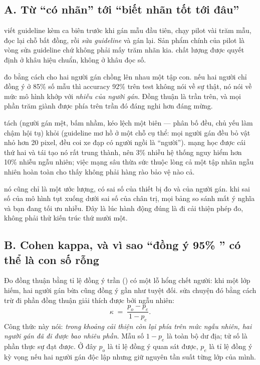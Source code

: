 \documentclass[../../deep_learning.tex]{subfiles}
\begin{document}
\subsection{A. Từ ``có nhãn'' tới ``biết nhãn tốt tới đâu''}
\begin{mach}
\item {} \gp viết guideline kèm ca biên trước khi gán mẫu đầu tiên, chạy pilot vài trăm mẫu, đọc lại chỗ bất đồng, rồi \emph{sửa guideline} và gán lại. Sản phẩm chính của pilot là vòng sửa guideline chứ không phải mấy trăm nhãn kia. \hq chất lượng được quyết định ở khâu hiệu chuẩn, không ở khâu đọc số.
\item {} \gp đo  bằng cách cho hai người gán chồng lên nhau một tập con. \hq nếu hai người chỉ đồng ý ở 85\%
 số mẫu thì accuracy 92\%
trên test không nói về sự thật, nó nói về mức mô hình khớp với \emph{nhiễu của người gán}. Đồng thuận là trần trên, và mọi phần trăm giành được phía trên trần đó đáng nghi hơn đáng mừng.
\item {} \gd tách  (người gán mệt, bấm nhầm, kéo lệch một biên --- phân bố đều, chủ yếu làm chậm hội tụ) khỏi  (guideline mơ hồ ở một chỗ cụ thể: mọi người gán đều bỏ vật nhỏ hơn 20 pixel, đều coi xe đạp có người ngồi là ``người''). \hq mạng học được cái thứ hai và tái tạo nó rất trung thành, nên 3\%
 nhiễu hệ thống nguy hiểm hơn 10\%
nhiễu ngẫu nhiên; việc mạng sâu thừa sức thuộc lòng cả một tập nhãn ngẫu nhiên hoàn toàn \cite{zhang2017rethinking} cho thấy  không phải hàng rào bảo vệ nào cả.
\item {} \gd nó cũng chỉ là một ước lượng, có sai số của thiết bị đo và của người gán. \hq khi sai số của mô hình tụt xuống dưới sai số của chân trị, mọi bảng so sánh mất ý nghĩa và bạn đang tối ưu nhiễu. Đây là lúc hành động đúng là đi cải thiện phép đo, không phải thử kiến trúc thứ mười một.
\end{mach}

\subsection{B. Cohen kappa, và vì sao ``đồng ý 95\%
'' có thể là con số rỗng}
Đo đồng thuận bằng tỉ lệ đồng ý trần () có một lỗ hổng chết người: khi một lớp hiếm, hai người gán bừa cũng đồng ý gần như tuyệt đối.  \cite{cohen1960kappa} sửa chuyện đó bằng cách trừ đi phần đồng thuận giải thích được bởi ngẫu nhiên:
\[
\kappa \;=\; \frac{p_o - p_e}{1 - p_e}.
\]
Công thức này nói: \emph{trong khoảng cải thiện còn lại phía trên mức ngẫu nhiên, hai người gán đã đi được bao nhiêu phần}. Mẫu số \(1-p_e\) là toàn bộ dư địa; tử số là phần thực sự đạt được. Ở đây \(p_o\) là tỉ lệ đồng ý quan sát được, \(p_e\) là tỉ lệ đồng ý kỳ vọng nếu hai người gán độc lập nhưng giữ nguyên tần suất từng lớp của mình.
\end{document}
